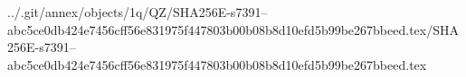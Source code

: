 ../.git/annex/objects/1q/QZ/SHA256E-s7391--abc5ce0db424e7456cff56e831975f447803b00b08b8d10efd5b99be267bbeed.tex/SHA256E-s7391--abc5ce0db424e7456cff56e831975f447803b00b08b8d10efd5b99be267bbeed.tex